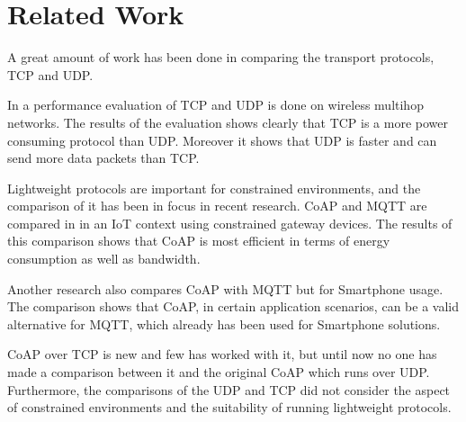 \section{Related Work}
A great amount of work has been done in comparing the transport protocols, TCP and UDP. 

In \cite{giannoulis2009tcp} a performance evaluation of TCP and UDP is done on wireless multihop networks. The results of the evaluation shows clearly that TCP is a more power consuming protocol than UDP. Moreover it shows that UDP is faster and can send more data packets than TCP.


Lightweight protocols are important for constrained environments, and the comparison of it has been in focus in recent research.
CoAP and MQTT are compared in \cite{bandyopadhyay2013lightweight} in an IoT context using constrained gateway devices. The results of this comparison shows that CoAP is most efficient in terms of energy consumption as well as bandwidth.

Another research \cite{de2013comparison} also compares CoAP with MQTT but for Smartphone usage. The comparison shows that CoAP, in certain application scenarios, can be a valid alternative for MQTT, which already has been used for Smartphone solutions.

CoAP over TCP is new and few has worked with it, but until now no one has made a comparison between it and the original CoAP which runs over UDP. 
Furthermore, the comparisons of the UDP and TCP did not consider the aspect of constrained environments and the suitability of running lightweight protocols.